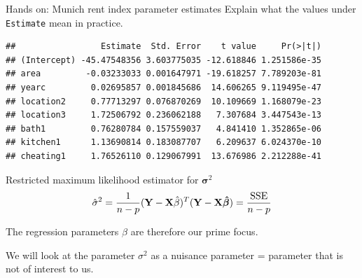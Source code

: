 \documentclass[
  ignorenonframetext,
]{beamer}
\newenvironment{Shaded}{\begin{snugshade}}{\end{snugshade}}
\newcommand{\AttributeTok}[1]{\textcolor[rgb]{0.13,0.29,0.53}{#1}}
\newcommand{\FunctionTok}[1]{\textcolor[rgb]{0.13,0.29,0.53}{\textbf{#1}}}
\newcommand{\NormalTok}[1]{#1}
\newcommand{\OtherTok}[1]{\textcolor[rgb]{0.56,0.35,0.01}{#1}}
\newcommand{\SpecialCharTok}[1]{\textcolor[rgb]{0.81,0.36,0.00}{\textbf{#1}}}
\begin{document}
\begin{frame}[fragile]
\begin{block}{Hands on: Munich rent index parameter estimates}
\label{hands-on-munich-rent-index-parameter-estimates}
Explain what the values under \texttt{Estimate} mean in practice.

\begin{Shaded}
\end{Shaded}

\begin{verbatim}
##                 Estimate  Std. Error    t value     Pr(>|t|)
## (Intercept) -45.47548356 3.603775035 -12.618846 1.251586e-35
## area         -0.03233033 0.001647971 -19.618257 7.789203e-81
## yearc         0.02695857 0.001845686  14.606265 9.119495e-47
## location2     0.77713297 0.076870269  10.109669 1.168079e-23
## location3     1.72506792 0.236062188   7.307684 3.447543e-13
## bath1         0.76280784 0.157559037   4.841410 1.352865e-06
## kitchen1      1.13690814 0.183087707   6.209637 6.024370e-10
## cheating1     1.76526110 0.129067991  13.676986 2.212288e-41
\end{verbatim}
\end{block}
\end{frame}

\begin{frame}
\begin{block}{Restricted maximum likelihood estimator for
\({\boldsymbol \sigma}^2\)}
\label{restricted-maximum-likelihood-estimator-for-boldsymbol-sigma2}
\[
\hat{\sigma}^2=\frac{1}{n-p} ({\bf Y}-{\bf X}{\hat{\beta}})^T ({\bf Y} - {\bf X}{\boldsymbol{\hat{\beta}}})=\frac{\text{SSE}}{n-p}
\]

The regression parameters \(\beta\) are therefore our prime focus.

We will look at the parameter \(\sigma^2\) as a nuisance parameter =
parameter that is not of interest to us.
\end{block}
\end{frame}
\end{document}
